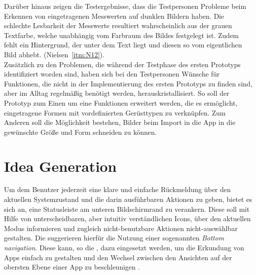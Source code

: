 Darüber hinaus zeigen die Testergebnisse, dass die Testpersonen Probleme beim Erkennen von eingetragenen Messwerten auf dunklen Bildern haben.
Die schlechte Lesbarkeit der Messwerte resultiert wahrscheinlich aus der grauen Textfarbe, welche unabhängig vom Farbraum des Bildes festgelegt ist.
Zudem fehlt ein Hintergrund, der unter dem Text liegt und diesen so vom eigentlichen Bild abhebt.
(Nielsen~\autoref{itm:N12}). \\

Zusätzlich zu den Problemen, die während der Testphase des ersten Prototyps identifiziert worden sind, haben sich bei den Testpersonen Wünsche für Funktionen, die nicht in der Implementierung des ersten Prototyps zu finden sind, aber im Alltag regelmäßig benötigt werden, herauskristallisiert. 
So soll der Prototyp zum Einen um eine Funktionen erweitert werden, die es ermöglicht, eingetragene Formen mit vordefinierten Gerüsttypen zu verknüpfen.
Zum Anderen soll die Möglichkeit bestehen, Bilder beim Import in die App in die gewünschte Größe und Form schneiden zu können.

\section{Idea Generation}\label{sec:idea2}
Um dem Benutzer jederzeit eine klare und einfache Rückmeldung über den aktuellen Systemzustand und die darin ausführbaren Aktionen zu geben, bietet es sich an, eine Statusleiste am unteren Bildschirmrand zu verankern.
Diese soll mit Hilfe von unterscheidbaren, aber intuitiv verständlichen Icons, über den aktuellen Modus informieren und zugleich nicht-benutzbare Aktionen nicht-auswählbar gestalten.
Die \mg{} suggerieren hierfür die Nutzung einer sogenannten \emph{Bottom navigation}.
Diese kann, so die \mg{}, dazu eingesetzt werden, um die Erkundung von Apps einfach zu gestalten und den Wechsel zwischen den Ansichten auf der obersten Ebene einer App zu beschleunigen \citep{BN18}. \\

